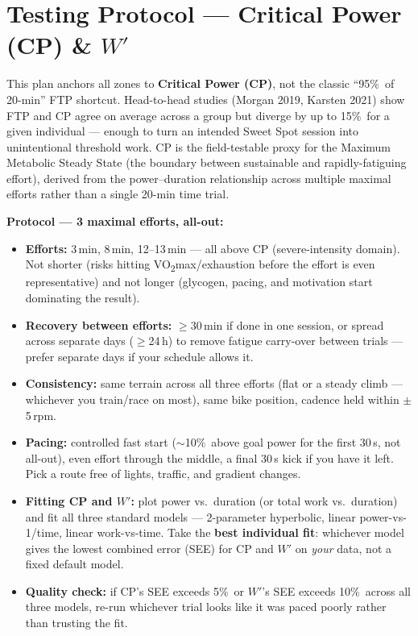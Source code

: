 \documentclass[a4paper,10pt]{article}
\newcommand{\NoteBox}[1]{%
  \noindent\colorbox{accent!6}{\begin{minipage}{\dimexpr\textwidth-2\fboxsep\relax}
  \footnotesize #1
  \end{minipage}}%
}
\begin{document}
\bigskip

\section*{Testing Protocol --- Critical Power (CP) \& $W'$}

\NoteBox{This plan anchors all zones to \textbf{Critical Power (CP)}, not the classic
``95\%\ of 20-min'' FTP shortcut. Head-to-head studies (Morgan 2019, Karsten 2021) show FTP and CP agree
on average across a group but diverge by up to 15\%\ for a given individual --- enough to turn an intended
Sweet Spot session into unintentional threshold work. CP is the field-testable proxy for the Maximum
Metabolic Steady State (the boundary between sustainable and rapidly-fatiguing effort), derived from the
power--duration relationship across multiple maximal efforts rather than a single 20-min time trial.}

\medskip

\noindent\textbf{\footnotesize Protocol --- 3 maximal efforts, all-out:}
\begin{itemize}[nosep, leftmargin=1.4em, itemsep=2pt, label=\textbf{\textcolor{accent}{--}}]
\footnotesize
  \item \textbf{Efforts:} 3\,min, 8\,min, 12--13\,min --- all above CP (severe-intensity domain). Not
        shorter (risks hitting VO\textsubscript{2}max/exhaustion before the effort is even representative)
        and not longer (glycogen, pacing, and motivation start dominating the result).
  \item \textbf{Recovery between efforts:} $\geq$30\,min if done in one session, or spread across separate
        days ($\geq$24\,h) to remove fatigue carry-over between trials --- prefer separate days if your
        schedule allows it.
  \item \textbf{Consistency:} same terrain across all three efforts (flat or a steady climb --- whichever
        you train/race on most), same bike position, cadence held within $\pm$5\,rpm.
  \item \textbf{Pacing:} controlled fast start ($\sim$10\%\ above goal power for the first 30\,s, not
        all-out), even effort through the middle, a final 30\,s kick if you have it left. Pick a route free
        of lights, traffic, and gradient changes.
  \item \textbf{Fitting CP and $W'$:} plot power vs.\ duration (or total work vs.\ duration) and fit all
        three standard models --- 2-parameter hyperbolic, linear power-vs-1/time, linear work-vs-time. Take
        the \textbf{best individual fit}: whichever model gives the lowest combined error (SEE) for CP and
        $W'$ on \emph{your} data, not a fixed default model.
  \item \textbf{Quality check:} if CP's SEE exceeds 5\%\ or $W'$'s SEE exceeds 10\%\ across all three
        models, re-run whichever trial looks like it was paced poorly rather than trusting the fit.
\end{itemize}
\end{document}
